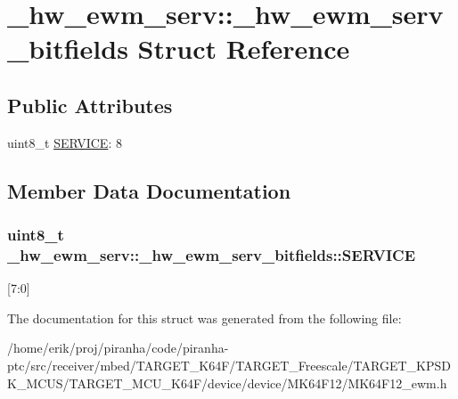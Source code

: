 \hypertarget{struct__hw__ewm__serv_1_1__hw__ewm__serv__bitfields}{}\section{\+\_\+hw\+\_\+ewm\+\_\+serv\+:\+:\+\_\+hw\+\_\+ewm\+\_\+serv\+\_\+bitfields Struct Reference}
\label{struct__hw__ewm__serv_1_1__hw__ewm__serv__bitfields}
\subsection*{Public Attributes}
\begin{DoxyCompactItemize}
\item 
uint8\+\_\+t \hyperlink{struct__hw__ewm__serv_1_1__hw__ewm__serv__bitfields_a78213502b782592d9047bf9396c17853}{S\+E\+R\+V\+I\+CE}\+: 8
\end{DoxyCompactItemize}


\subsection{Member Data Documentation}
\subsubsection[{\texorpdfstring{S\+E\+R\+V\+I\+CE}{SERVICE}}]{\setlength{\rightskip}{0pt plus 5cm}uint8\+\_\+t \+\_\+hw\+\_\+ewm\+\_\+serv\+::\+\_\+hw\+\_\+ewm\+\_\+serv\+\_\+bitfields\+::\+S\+E\+R\+V\+I\+CE}\hypertarget{struct__hw__ewm__serv_1_1__hw__ewm__serv__bitfields_a78213502b782592d9047bf9396c17853}{}\label{struct__hw__ewm__serv_1_1__hw__ewm__serv__bitfields_a78213502b782592d9047bf9396c17853}
\mbox{[}7\+:0\mbox{]} 

The documentation for this struct was generated from the following file\+:\begin{DoxyCompactItemize}
\item 
/home/erik/proj/piranha/code/piranha-\/ptc/src/receiver/mbed/\+T\+A\+R\+G\+E\+T\+\_\+\+K64\+F/\+T\+A\+R\+G\+E\+T\+\_\+\+Freescale/\+T\+A\+R\+G\+E\+T\+\_\+\+K\+P\+S\+D\+K\+\_\+\+M\+C\+U\+S/\+T\+A\+R\+G\+E\+T\+\_\+\+M\+C\+U\+\_\+\+K64\+F/device/device/\+M\+K64\+F12/M\+K64\+F12\+\_\+ewm.\+h\end{DoxyCompactItemize}
